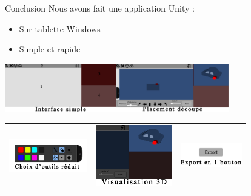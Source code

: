 \documentclass[a4paper,10pt]{beamer}
\begin{document}
	\begin{frame}{Conclusion}
		Nous avons fait une application Unity :
		\begin{itemize}
			\item Sur tablette Windows\pause
			\item Simple et rapide\pause
		\end{itemize}
		\centerline{\includegraphics[height=60pt]{images/conclu/menu.png}\pause\hspace{10 mm}\includegraphics[height=60pt]{images/conclu/place.png}\pause}
		\begin{tabular}{lll}
			\includegraphics[height=40pt]{images/conclu/outils.png} & \pause\includegraphics[height=75pt]{images/conclu/visu.png}\pause & \includegraphics[height=30pt]{images/conclu/export.png}
		\end{tabular}
		 
	\end{frame}
		
\end{document}
